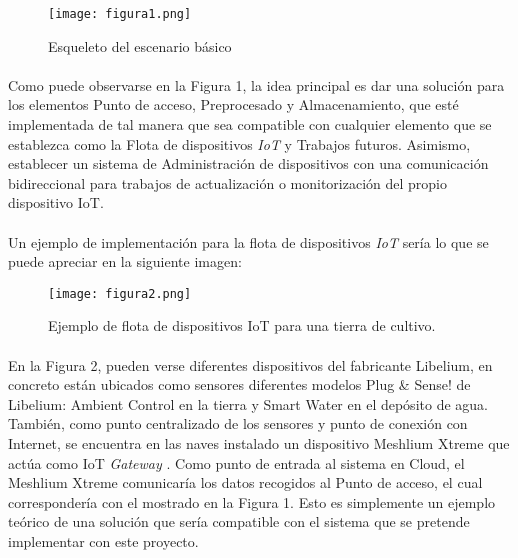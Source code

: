 \documentclass[../../memoria.tex]{subfiles}
\begin{document}
\begin{figure}[H]
    \centering
    \texttt{[image: figura1.png]}
    \caption{Esqueleto del escenario básico}
    \label{fig:figura1}
\end{figure}

\paragraph{}
Como puede observarse en la Figura 1, la idea principal es dar una solución para los elementos Punto de acceso, Preprocesado y Almacenamiento, que esté implementada de tal manera que sea compatible con cualquier elemento que se establezca como la Flota de dispositivos \textit{IoT} y Trabajos futuros. Asimismo, establecer un sistema de Administración de dispositivos con una comunicación bidireccional para trabajos de actualización o monitorización del propio dispositivo IoT.

\paragraph{}
Un ejemplo de implementación para la flota de dispositivos \textit{IoT} sería lo que se puede apreciar en la siguiente imagen:

\begin{figure}[H]
    \centering
    \texttt{[image: figura2.png]}
    \caption{Ejemplo de flota de dispositivos IoT para una tierra de cultivo.}
    \label{fig:figura2}
\end{figure}

\paragraph{}
En la Figura 2, pueden verse diferentes dispositivos del fabricante Libelium, en concreto están ubicados como sensores diferentes modelos Plug \& Sense! de Libelium: Ambient Control en la tierra y Smart Water en el depósito de agua. También, como punto centralizado de los sensores y punto de conexión con Internet, se encuentra en las naves instalado un dispositivo Meshlium Xtreme que actúa como IoT \textit{Gateway} \cite{libelium}. Como punto de entrada al sistema en Cloud, el Meshlium Xtreme comunicaría los datos recogidos al Punto de acceso, el cual correspondería con el mostrado en la Figura 1. Esto es simplemente un ejemplo teórico de una solución que sería compatible con el sistema que se pretende implementar con este proyecto.
\end{document}
